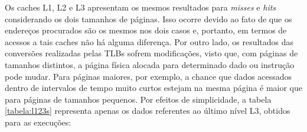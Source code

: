 \documentclass[12pt]{article}
\begin{document}
% 		
% 		

Os caches L1, L2 e L3 apresentam os mesmos resultados para \textit{misses} e
\textit{hits} considerando os dois tamanhos de páginas. Isso ocorre devido ao
fato de que os endereços procurados são os mesmos nos dois casos e, portanto,
em termos de acessos a tais caches não há alguma diferença. Por outro lado, os
resultados das conversões realizadas pelas TLBs sofrem modificações, visto que,
com páginas de tamanhos distintos, a página física alocada para determinado
dado ou instrução pode mudar. Para páginas maiores, por exemplo, a chance que dados
acessados dentro de intervalos de tempo muito curtos estejam na mesma página é
maior que para páginas de tamanhos pequenos. Por efeitos de simplicidade, a
tabela \ref{tabela:l123s} representa apenas os dados referentes ao último
nível L3, obtidos para as execuções:

\vspace{-12pt}
\end{document}
